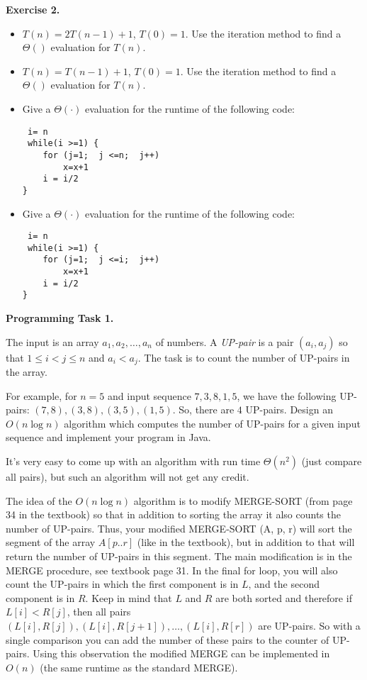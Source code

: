 \documentclass[11pt]{article}
\begin{document}
\textbf{Exercise 2.}
\begin{itemize}
\item $T(n) = 2T(n-1) + 1$, $T(0)=1$.  Use the iteration method to find a $\Theta()$ evaluation for $T(n)$.
\item $T(n) = T(n-1) + 1$,  $T(0)=1$.  Use the iteration method to find a $\Theta()$ evaluation for $T(n)$.
\item Give a  $\Theta( \cdot)$ evaluation for the runtime of the following code:
\begin{verbatim}
 i= n
 while(i >=1) {
    for (j=1;  j <=n;  j++)
        x=x+1
    i = i/2
}    
\end{verbatim}
\item Give a  $\Theta( \cdot)$ evaluation for the runtime of the following code:
\begin{verbatim}
 i= n
 while(i >=1) {
    for (j=1;  j <=i;  j++)
        x=x+1
    i = i/2
}
\end{verbatim}
\end{itemize}
\newpage
\textbf{Programming Task 1.}

The input is an array $a_1, a_2, \ldots, a_n$ of numbers.  A  \emph{UP-pair} is a pair $(a_i, a_j)$  so that $1 \le i < j \le n$ and $a_i < a_j$. The task is to count the number of UP-pairs
in the array.

For example, for $n = 5$ and input sequence $7, 3, 8, 1, 5$, we have the following UP-pairs: $(7,8),  (3, 8),  (3, 5),  (1,5)$.  So, there are $4$ UP-pairs. 
Design an $O(n \log n)$ algorithm which computes the number of UP-pairs for a
given input sequence and implement your program in Java.

It's very easy to come up with an algorithm with run time  $\Theta(n^2)$ (just compare all pairs), but such an algorithm will not get any credit.

The idea of the $O(n \log n)$  algorithm is to modify MERGE-SORT (from page 34 in the textbook)  so that in addition to sorting the array it also counts the number of UP-pairs. Thus, your modified MERGE-SORT (A, p, r) will sort the segment of the array $A[p..r]$  (like in the textbook), but in addition to that will return the number of UP-pairs in this segment.  The main modification is in the MERGE  procedure, see textbook page 31. In the final for loop, you will also count the UP-pairs in which the first component is in $L$, and the second component is in $R$. Keep in mind that $L$ and $R$ are both sorted and therefore if $L[i] < R[j]$, then all pairs $(L[i], R[j]),  (L[i], R[j+1]), \ldots, (L[i], R[r])$ are UP-pairs. So with a single comparison you can add the number of these pairs to the counter of UP-pairs. Using this observation the modified MERGE can be implemented in $O(n)$ (the same runtime as the standard MERGE).
\medskip
\end{document}
